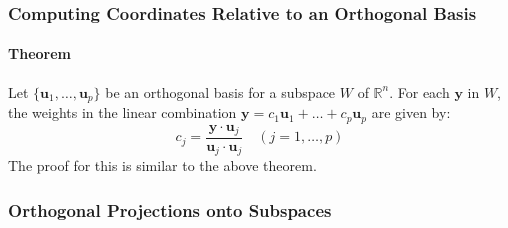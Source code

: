 \documentclass[../linear-algebra.tex]{subfiles}
\begin{document}
\subsubsection{Computing Coordinates Relative to an Orthogonal Basis}
\paragraph{Theorem} Let $\{\mathbf{u}_1, \dots, \mathbf{u}_p\}$ be an orthogonal basis for a subspace $W$ of $\mathbb{R}^n$. For each $\mathbf{y}$ in $W$, the weights in the linear combination $\mathbf{y} = c_1\mathbf{u}_1 + \dots + c_p\mathbf{u}_p$ are given by:
$$c_j = \frac{\mathbf{y} \cdot \mathbf{u}_j}{\mathbf{u}_j \cdot \mathbf{u}_j} \quad (j = 1, \dots, p)$$
The proof for this is similar to the above theorem.
\subsubsection{Orthogonal Projections onto Subspaces}
\end{document}
